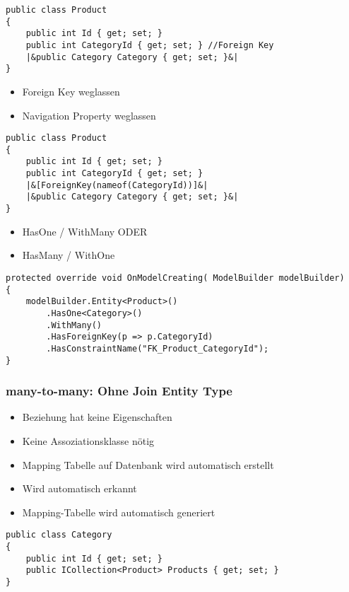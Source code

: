 \begin{multicols*}{2}
\begin{lstlisting}
public class Product
{
    public int Id { get; set; }
    public int CategoryId { get; set; } //Foreign Key
    |&public Category Category { get; set; }&|
}
\end{lstlisting}
\begin{itemize}
    \item Foreign Key weglassen
    \item Navigation Property weglassen
\end{itemize}
\begin{lstlisting}
public class Product
{
    public int Id { get; set; }
    public int CategoryId { get; set; } 
    |&[ForeignKey(nameof(CategoryId))]&|
    |&public Category Category { get; set; }&|
}    
\end{lstlisting}
\begin{itemize}
    \item HasOne / WithMany ODER
    \item HasMany / WithOne
\end{itemize}
\begin{lstlisting}
protected override void OnModelCreating( ModelBuilder modelBuilder)
{
    modelBuilder.Entity<Product>()
        .HasOne<Category>()
        .WithMany()
        .HasForeignKey(p => p.CategoryId)
        .HasConstraintName("FK_Product_CategoryId");
}
\end{lstlisting}

\subsubsection{many-to-many: Ohne Join Entity Type}
\begin{itemize}
    \item Beziehung hat keine Eigenschaften
    \item Keine Assoziationsklasse nötig
    \item Mapping Tabelle auf Datenbank wird automatisch erstellt
\end{itemize}
\begin{itemize}
    \item Wird automatisch erkannt
    \item Mapping-Tabelle wird automatisch generiert
\end{itemize}
\begin{lstlisting}
public class Category
{
    public int Id { get; set; }
    public ICollection<Product> Products { get; set; } 
}


\end{lstlisting}
\end{multicols*}
